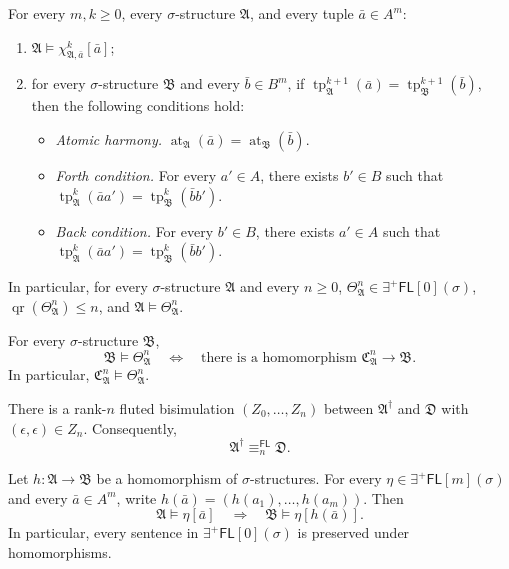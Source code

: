 \documentclass[10pt,a4paper]{amsart}
\newcommand{\A}{\mathfrak{A}}
\newcommand{\B}{\mathfrak{B}}
\newcommand{\C}{\mathfrak{C}}
\newcommand{\D}{\mathfrak{D}}
\newcommand{\EPFL}{\exists^{+}\!\mathsf{FL}}
\newcommand{\FL}{\mathsf{FL}}
\newcommand{\at}{\operatorname{at}}
\newcommand{\qr}{\operatorname{qr}}
\newcommand{\tp}{\operatorname{tp}}
\begin{document}
\begin{lem}\label{lem:chi-basic}
For every $m,k\geq0$, every $\sigma$-structure $\A$, and every tuple
$\bar a\in A^m$:
\begin{enumerate}[label=\textup{(\roman*)}]
  \item $\A\models\chi_{\A,\bar a}^{k}[\bar a]$;
  \item for every $\sigma$-structure $\B$ and every $\bar b\in B^m$, if
  $\tp_{\A}^{k+1}(\bar a)=\tp_{\B}^{k+1}(\bar b)$, then the following
  conditions hold:
  \begin{itemize}
    \item \emph{Atomic harmony.}
    $\at_{\A}(\bar a)=\at_{\B}(\bar b)$.
    \item \emph{Forth condition.}  For every $a'\in A$, there exists $b'\in B$ such
    that
    $\tp_{\A}^{k}(\bar a a')=\tp_{\B}^{k}(\bar b b')$.
    \item \emph{Back condition.}  For every $b'\in B$, there exists $a'\in A$ such
    that
    $\tp_{\A}^{k}(\bar a a')=\tp_{\B}^{k}(\bar b b')$.
  \end{itemize}
\end{enumerate}
In particular, for every $\sigma$-structure $\A$ and every $n\geq0$,
$\Theta_{\A}^{n}\in\EPFL[0](\sigma)$,
$\qr(\Theta_{\A}^{n})\leq n$, and $\A\models\Theta_{\A}^{n}$.
\end{lem}

\begin{lem}\label{lem:canonical-query}
For every $\sigma$-structure $\B$,
\[
   \B\models\Theta_{\A}^{n}
   \quad\Longleftrightarrow\quad
   \text{there is a homomorphism }\C_{\A}^{n}\longrightarrow\B.
\]
In particular, $\C_{\A}^{n}\models\Theta_{\A}^{n}$.

\end{lem}

\begin{lem}\label{lem:reset}
There is a rank-$n$ fluted bisimulation $(Z_0,\ldots,Z_n)$ between
$\A^{\dagger}$ and $\D$ with $(\epsilon,\epsilon)\in Z_n$.  Consequently,
\[
   \A^{\dagger}\equiv_n^{\FL}\D.
\]
\end{lem}

\begin{lem}\label{lem:ep-hom}
Let $h:\A\to\B$ be a homomorphism of $\sigma$-structures.  For every
$\eta\in\EPFL[m](\sigma)$ and every $\bar a\in A^m$, write
$h(\bar a)=(h(a_1),\ldots,h(a_m))$.  Then
\[
  \A\models\eta[\bar a]
  \quad\Longrightarrow\quad
  \B\models\eta[h(\bar a)].
\]
In particular, every sentence in $\EPFL[0](\sigma)$ is preserved under
homomorphisms.
\end{lem}
\end{document}

